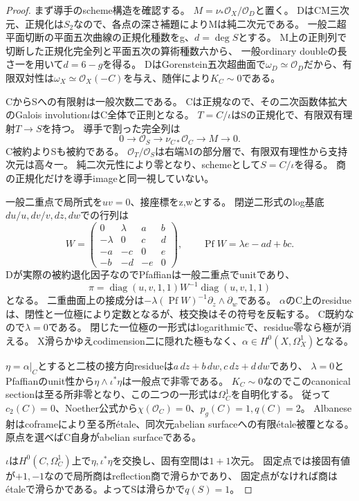 \documentclass[a4paper,11pt]{ltjsarticle}
\theoremstyle{definition}
\begin{document}
\begin{proof}
まず導手のscheme構造を確認する。
$M=\nu_*\mathcal O_X/\mathcal O_D$と置く。
DはCM三次元、正規化は$S_2$なので、各点の深さ補題によりMは純二次元である。
一般二超平面切断の平面五次曲線の正規化種数をg、$d=\deg S$とする。
M上の正則列で切断した正規化完全列と平面五次の算術種数六から、
一般ordinary doubleの長さ一を用いて$d=6-g$を得る。
DはGorenstein五次超曲面で$\omega_D\simeq\mathcal O_D$だから、有限双対性は$\omega_X\simeq\mathcal O_X(-C)$を与え、随伴により$K_C\sim0$である。

CからSへの有限射は一般次数二である。
Cは正規なので、その二次函数体拡大のGalois involution$\iota$はC全体で正則となる。
$T=C/\iota$はSの正規化で、有限双有理射$T\to S$を持つ。
導手で割った完全列は
\[
 0\longrightarrow\mathcal O_S\longrightarrow\nu_{C*}\mathcal O_C
       \longrightarrow M\longrightarrow0.
\]
C被約よりSも被約である。
$\mathcal O_T/\mathcal O_S$は右端Mの部分層で、有限双有理性から支持次元は高々一。
純二次元性により零となり、schemeとして$S=C/\iota$を得る。
商の正規化だけを導手imageと同一視していない。

一般二重点で局所式を$uv=0$、接座標をz,wとする。
閉逆二形式のlog基底$du/u,dv/v,dz,dw$での行列は
\[
 W=\begin{pmatrix}
 0&\lambda&a&b\\-\lambda&0&c&d\\-a&-c&0&e\\-b&-d&-e&0
 \end{pmatrix},\qquad\operatorname{Pf}W=\lambda e-ad+bc.
\]
Dが実際の被約退化因子なのでPfaffianは一般二重点でunitであり、
\[
 \pi=\operatorname{diag}(u,v,1,1)W^{-1}\operatorname{diag}(u,v,1,1)
\]
となる。
二重曲面上の接成分は$-\lambda(\operatorname{Pf}W)^{-1}\partial_z\wedge\partial_w$である。
$\alpha$のC上のresidueは、閉性と一位極により定数となるが、枝交換はその符号を反転する。
C既約なので$\lambda=0$である。
閉じた一位極の一形式はlogarithmicで、residue零なら極が消える。
X滑らかゆえcodimension二に隠れた極もなく、$\alpha\in H^0(X,\Omega_X^1)$となる。

$\eta=\alpha|_C$とすると二枝の接方向residueは$a\,dz+b\,dw,c\,dz+d\,dw$であり、
$\lambda=0$とPfaffianのunit性から$\eta\wedge\iota^*\eta$は一般点で非零である。
$K_C\sim0$なのでこのcanonical sectionは至る所非零となり、この二つの一形式は$\Omega_C^1$を自明化する。
従って$c_2(C)=0$、Noether公式から$\chi(\mathcal O_C)=0$、$p_g(C)=1,q(C)=2$。
Albanese射はcoframeにより至る所étale、同次元abelian surfaceへの有限étale被覆となる。
原点を選べばC自身がabelian surfaceである。

$\iota$は$H^0(C,\Omega_C^1)$上で$\eta,\iota^*\eta$を交換し、固有空間は$1+1$次元。
固定点では接固有値が$+1,-1$なので局所商はreflection商で滑らかであり、
固定点がなければ商はétaleで滑らかである。よってSは滑らかで$q(S)=1$。


\end{proof}
\end{document}
